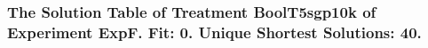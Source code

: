  \begin{frame}
 \fontsize{8pt}{9pt}\selectfont
 \frametitle{ The Solution Table of Treatment BoolT5sgp10k of Experiment ExpF. Fit: 0. Unique Shortest Solutions: 40. }

 \label{ExpFSolutionTable008.tex}  
 \end{frame}

